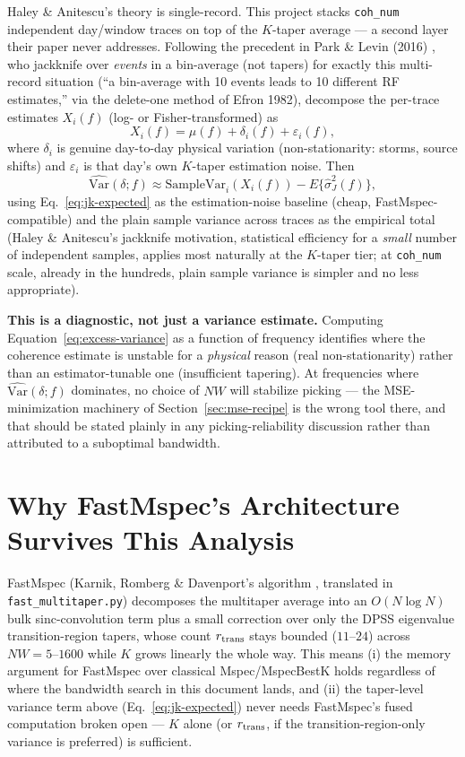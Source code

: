 \documentclass[11pt]{article}
\begin{document}
Haley \& Anitescu's theory is single-record. This project stacks \texttt{coh\_num} independent
day/window traces on top of the $K$-taper average --- a second layer their paper never addresses.
Following the precedent in Park \& Levin (2016) \cite{parklevin2016}, who jackknife over
\emph{events} in a bin-average (not tapers) for exactly this multi-record situation (``a
bin-average with 10 events leads to 10 different RF estimates,'' via the delete-one method of
Efron 1982), decompose the per-trace estimates $X_i(f)$ (log- or Fisher-transformed) as
\begin{equation}
  X_i(f) = \mu(f) + \delta_i(f) + \varepsilon_i(f),
\end{equation}
where $\delta_i$ is genuine day-to-day physical variation (non-stationarity: storms, source
shifts) and $\varepsilon_i$ is that day's own $K$-taper estimation noise. Then
\begin{equation}
  \widehat{\mathrm{Var}}(\delta; f) \approx \mathrm{SampleVar}_{i}(X_i(f)) -
  E\{\hat\sigma_J^2(f)\},
  \label{eq:excess-variance}
\end{equation}
using Eq.~\ref{eq:jk-expected} as the estimation-noise baseline (cheap, FastMspec-compatible) and
the plain sample variance across traces as the empirical total (Haley \& Anitescu's jackknife
motivation, statistical efficiency for a \emph{small} number of independent samples, applies most
naturally at the $K$-taper tier; at \texttt{coh\_num} scale, already in the hundreds, plain sample
variance is simpler and no less appropriate).

\textbf{This is a diagnostic, not just a variance estimate.} Computing
Equation~\ref{eq:excess-variance} as a function of frequency identifies where the coherence
estimate is unstable for a \emph{physical} reason (real non-stationarity) rather than an
estimator-tunable one (insufficient tapering). At frequencies where $\widehat{\mathrm{Var}}
(\delta; f)$ dominates, no choice of $NW$ will stabilize picking --- the MSE-minimization
machinery of Section~\ref{sec:mse-recipe} is the wrong tool there, and that should be stated
plainly in any picking-reliability discussion rather than attributed to a suboptimal bandwidth.

\section{Why FastMspec's Architecture Survives This Analysis}
\label{sec:fastmspec}

FastMspec (Karnik, Romberg \& Davenport's algorithm \cite{karnik2022}, translated in
\texttt{fast\_multitaper.py}) decomposes the multitaper average into an $O(N\log N)$ bulk
sinc-convolution term plus a small correction over only the DPSS eigenvalue transition-region
tapers, whose count $r_{\rm trans}$ stays bounded ($11$--$24$) across $NW=5$--$1600$ while $K$
grows linearly the whole way. This means (i) the memory argument for FastMspec over classical
Mspec/MspecBestK holds regardless of where the bandwidth search in this document lands, and (ii)
the taper-level variance term above (Eq.~\ref{eq:jk-expected}) never needs FastMspec's fused
computation broken open --- $K$ alone (or $r_{\rm trans}$, if the transition-region-only variance
is preferred) is sufficient.
\end{document}

